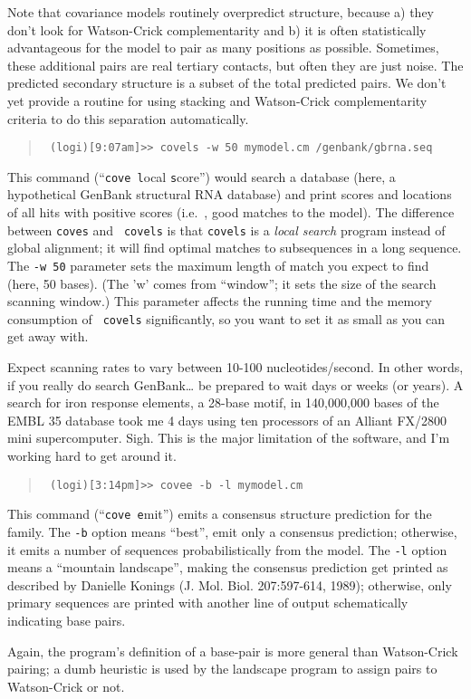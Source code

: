 Note that covariance models routinely overpredict structure, because
a) they don't look for Watson-Crick complementarity and b) it is often
statistically advantageous for the model to pair as many positions as
possible. Sometimes, these additional pairs are real tertiary
contacts, but often they are just noise. The predicted secondary
structure is a subset of the total predicted pairs. We don't yet
provide a routine for using stacking and Watson-Crick complementarity
criteria to do this separation automatically.

\begin{quotation}
{\tt
(logi)[9:07am]>> covels -w 50 mymodel.cm /genbank/gbrna.seq
}
\end{quotation}

This command (``{\tt cove l}ocal {\tt s}core'') would search a database
(here, a hypothetical GenBank structural RNA database) and print
scores and locations of all hits with positive scores (i.e.\ , good
matches to the model). The difference between {\tt coves} and {\tt
covels} is that {\tt covels} is a {\em local search} program instead
of global alignment; it will find optimal matches to subsequences
in a long sequence.  The {\tt -w 50} parameter sets the maximum length
of match you expect to find (here, 50 bases). (The 'w' comes from
``window''; it sets the size of the search scanning window.)  This
parameter affects the running time and the memory consumption of {\tt
covels} significantly, so you want to set it as small as you can get
away with.

Expect scanning rates to vary between 10-100 nucleotides/second. In
other words, if you really do search GenBank\ldots{} be prepared to
wait days or weeks (or years). A search for iron response elements, a
28-base motif, in 140,000,000 bases of the EMBL 35 database took me 4
days using ten processors of an Alliant FX/2800 mini supercomputer.
Sigh. This is the major limitation of the software, and I'm working
hard to get around it.

\begin{quotation}
{\tt
(logi)[3:14pm]>> covee -b -l mymodel.cm
}
\end{quotation}

This command (``{\tt cove e}mit'') emits a consensus structure
prediction for the family. The {\tt -b} option means ``best'', emit
only a consensus prediction; otherwise, it emits a number of sequences
probabilistically from the model. The {\tt -l} option means a
``mountain landscape'', making the consensus prediction get printed as
described by Danielle Konings (J.  Mol.  Biol. 207:597-614, 1989);
otherwise, only primary sequences are printed with another line of
output schematically indicating base pairs.

Again, the program's definition of a base-pair is more general than
Watson-Crick pairing; a dumb heuristic is used by the landscape
program to assign pairs to Watson-Crick or not.


